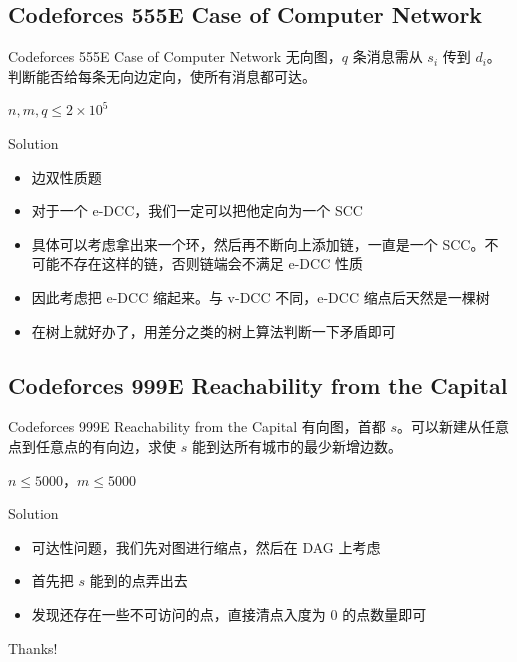 ﻿\documentclass[aspectratio=169]{ctexbeamer}
\begin{document}
\subsection{Codeforces 555E Case of Computer Network}

\begin{frame}{Codeforces 555E Case of Computer Network}
      无向图，$q$ 条消息需从 $s_i$ 传到 $d_i$。判断能否给每条无向边定向，使所有消息都可达。
      
      $n,m,q\le 2\times 10^5$
\end{frame}

\begin{frame}{Solution}
    \begin{itemize}
        \item 边双性质题
        \item 对于一个 e-DCC，我们一定可以把他定向为一个 SCC
        \item 具体可以考虑拿出来一个环，然后再不断向上添加链，一直是一个 SCC。不可能不存在这样的链，否则链端会不满足 e-DCC 性质
        \item 因此考虑把 e-DCC 缩起来。与 v-DCC 不同，e-DCC 缩点后天然是一棵树
        \item 在树上就好办了，用差分之类的树上算法判断一下矛盾即可
    \end{itemize}    
\end{frame}









\subsection{Codeforces 999E Reachability from the Capital}

\begin{frame}{Codeforces 999E Reachability from the Capital}
      有向图，首都 $s$。可以新建从任意点到任意点的有向边，求使 $s$ 能到达所有城市的最少新增边数。
      
      $n\le 5000$，$m\le 5000$
\end{frame}

\begin{frame}{Solution}
    \begin{itemize}
        \item 可达性问题，我们先对图进行缩点，然后在 DAG 上考虑
        \item 首先把 $s$ 能到的点弄出去
        \item 发现还存在一些不可访问的点，直接清点入度为 $ 0 $ 的点数量即可
    \end{itemize}    
\end{frame}


\begin{frame}
    \begin{center}
        {\Huge\calligra Thanks!}
    \end{center}
\end{frame}
\end{document}
